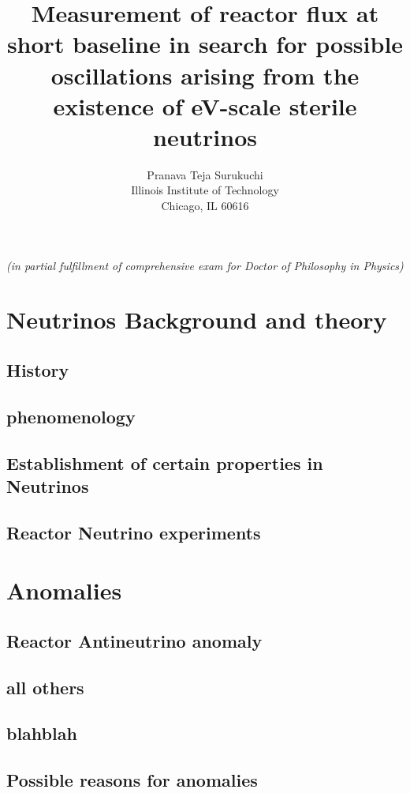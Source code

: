 \documentclass[11pt]{article}
\author{Pranava Teja Surukuchi \\ Illinois Institute of Technology\\ Chicago, IL 60616}
\title{Measurement of reactor flux at short baseline in search for possible oscillations arising from the existence of eV-scale sterile neutrinos}
\date{\displaydate{date}}
\begin{document}
\maketitle
\begin{center}
\textit{(in partial fulfillment of comprehensive exam for Doctor of Philosophy in Physics)}
\end{center}
\newpage

\tableofcontents

\section{Neutrinos Background and theory}

\subsection{History}

\subsection{phenomenology}

\subsection{Establishment of certain properties in Neutrinos}

\subsection{Reactor Neutrino experiments}

\section{Anomalies}

\subsection{Reactor Antineutrino anomaly }

\subsection{all others}

\subsection{blahblah}

\subsection{Possible reasons for anomalies}
\end{document}
